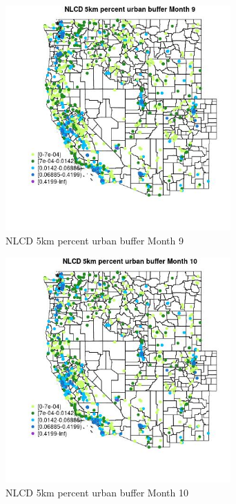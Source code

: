 \begin{figure} 
\centering  
\includegraphics[width=0.77\textwidth]{Code_Outputs/Report_ML_input_PM25_Step4_part_f_de_duplicated_aveswNAs_MapObsMo9NLCD_5km_percent_urban_buffer.jpg} 
\caption{\label{fig:Report_ML_input_PM25_Step4_part_f_de_duplicated_aveswNAsMapObsMo9NLCD_5km_percent_urban_buffer}NLCD 5km percent urban buffer Month 9} 
\end{figure} 
 

\begin{figure} 
\centering  
\includegraphics[width=0.77\textwidth]{Code_Outputs/Report_ML_input_PM25_Step4_part_f_de_duplicated_aveswNAs_MapObsMo10NLCD_5km_percent_urban_buffer.jpg} 
\caption{\label{fig:Report_ML_input_PM25_Step4_part_f_de_duplicated_aveswNAsMapObsMo10NLCD_5km_percent_urban_buffer}NLCD 5km percent urban buffer Month 10} 
\end{figure} 
 

